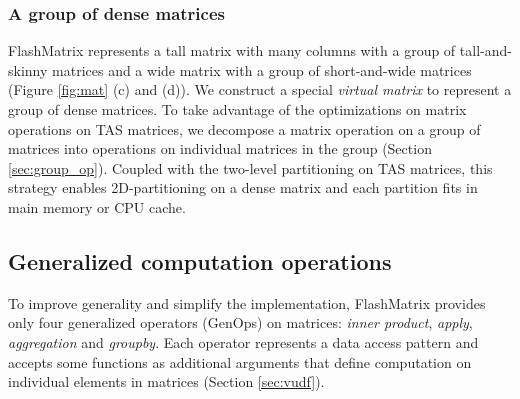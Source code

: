 

\subsubsection{A group of dense matrices} \label{sec:mat_group}
FlashMatrix represents a tall matrix with many columns with a group of
tall-and-skinny matrices and a wide matrix with a group of short-and-wide
matrices (Figure \ref{fig:mat} (c) and (d)). We construct a special
\textit{virtual matrix} to represent
a group of dense matrices. To take advantage of the optimizations on matrix
operations on TAS matrices, we decompose a matrix operation on a group of
matrices into operations on individual matrices in the group (Section
\ref{sec:group_op}).
Coupled with the two-level partitioning on TAS matrices, this strategy enables
2D-partitioning on a dense matrix and each partition fits in main memory
or CPU cache.




\subsection{Generalized computation operations} \label{sec:genop}
To improve generality and simplify the implementation, FlashMatrix provides
only four generalized operators (GenOps) on matrices: \textit{inner product},
\textit{apply}, \textit{aggregation} and \textit{groupby}. Each operator
represents a data access pattern and accepts some functions as additional
arguments that define computation
on individual elements in matrices (Section \ref{sec:vudf}).

